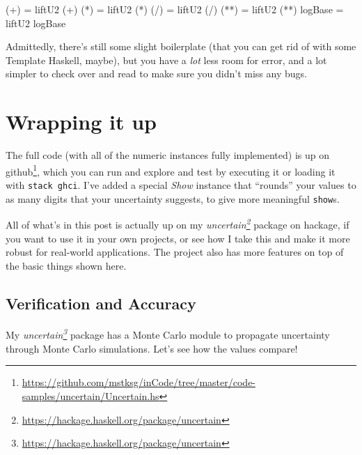 \documentclass[]{article}
\newenvironment{Shaded}{}{}
\newcommand{\FunctionTok}[1]{\textcolor[rgb]{0.02,0.16,0.49}{#1}}
\newcommand{\NormalTok}[1]{#1}
\newcommand{\OperatorTok}[1]{\textcolor[rgb]{0.40,0.40,0.40}{#1}}
\newcommand{\OtherTok}[1]{\textcolor[rgb]{0.00,0.44,0.13}{#1}}
\renewcommand{\href}[2]{#2\footnote{\url{#1}}}
\begin{document}
\begin{Shaded}
\begin{Highlighting}[]
\NormalTok{(}\OperatorTok{+}\NormalTok{)     }\OtherTok{=}\NormalTok{ liftU2 (}\OperatorTok{+}\NormalTok{)}
\NormalTok{(}\OperatorTok{*}\NormalTok{)     }\OtherTok{=}\NormalTok{ liftU2 (}\OperatorTok{*}\NormalTok{)}
\NormalTok{(}\OperatorTok{/}\NormalTok{)     }\OtherTok{=}\NormalTok{ liftU2 (}\OperatorTok{/}\NormalTok{)}
\NormalTok{(}\OperatorTok{**}\NormalTok{)    }\OtherTok{=}\NormalTok{ liftU2 (}\OperatorTok{**}\NormalTok{)}
\FunctionTok{logBase} \OtherTok{=}\NormalTok{ liftU2 }\FunctionTok{logBase}
\end{Highlighting}
\end{Shaded}

Admittedly, there's still some slight boilerplate (that you can get rid of with
some Template Haskell, maybe), but you have a \emph{lot} less room for error,
and a lot simpler to check over and read to make sure you didn't miss any bugs.

\section{Wrapping it up}\label{wrapping-it-up}

The full code (with all of the numeric instances fully implemented) is up
\href{https://github.com/mstksg/inCode/tree/master/code-samples/uncertain/Uncertain.hs}{on
github}, which you can run and explore and test by executing it or loading it
with \texttt{stack\ ghci}. I've added a special \emph{Show} instance that
``rounds'' your values to as many digits that your uncertainty suggests, to give
more meaningful \texttt{show}s.

All of what's in this post is actually up on my
\emph{\href{https://hackage.haskell.org/package/uncertain}{uncertain}} package
on hackage, if you want to use it in your own projects, or see how I take this
and make it more robust for real-world applications. The project also has more
features on top of the basic things shown here.

\subsection{Verification and Accuracy}\label{verification-and-accuracy}

My \emph{\href{https://hackage.haskell.org/package/uncertain}{uncertain}}
package has a Monte Carlo module to propagate uncertainty through Monte Carlo
simulations. Let's see how the values compare!
\end{document}
